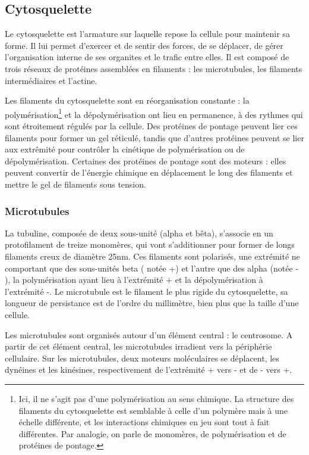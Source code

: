 \documentclass{report}
\begin{document}
\subsection{Cytosquelette}

Le cytosquelette est l'armature sur laquelle repose la cellule pour maintenir sa forme. Il lui permet d'exercer et de sentir des forces, de se déplacer, de gérer l'organisation interne de ses organites et le trafic entre elles. Il est composé de trois réseaux de protéines assemblées en filaments : les microtubules, les filaments intermédiaires et l'actine. 

Les filaments du cytosquelette sont en réorganisation constante : la polymérisation\footnote{Ici, il ne s'agit pas d'une polymérisation au sens chimique. La structure des filaments du cytosquelette est semblable à celle d'un polymère mais à une échelle différente, et les interactions chimiques en jeu sont tout à fait différentes. Par analogie, on parle de monomères, de polymérisation et de protéines de pontage.} et la dépolymérisation ont lieu en permanence, à des rythmes qui sont étroitement régulés par la cellule. 
Des protéines de pontage peuvent lier ces filaments pour former un gel réticulé, tandis que d'autres protéines peuvent se lier aux extrêmité pour contrôler la cinétique de polymérisation ou de dépolymérisation. Certaines des protéines de pontage sont des moteurs : elles peuvent convertir de l'énergie chimique en déplacement le long des filaments et mettre le gel de filaments sous tension. 

\subsubsection{Microtubules}

La tubuline, composée de deux sous-unité (alpha et bêta), s'associe en un protofilament de treize monomères, qui vont s'additionner pour former de longs filaments creux de diamètre 25nm. Ces filaments sont polarisés, une extrémité ne comportant que des sous-unités beta ( notée +) et l'autre que des alpha (notée - ), la polymérisation ayant lieu à l'extrémité + et la dépolymérisation à l'extrémité -. 
Le microtubule est le filament le plus rigide du cytosquelette, sa longueur de persistance est de l'ordre du millimètre, bien plus que la taille d'une cellule. 

Les microtubules sont organisés autour d'un élément central : le centrosome. A partir de cet élément central, les microtubules irradient vers la périphérie cellulaire. 
Sur les microtubules, deux moteurs moléculaires se déplacent, les dynéines et les kinésines, respectivement de l'extrémité + vers - et de - vers +.  
\end{document}

